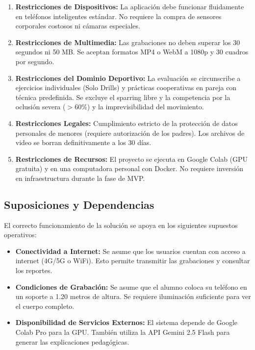 \documentclass[12pt,letterpaper]{article}
\begin{document}
\begin{enumerate}
    \item \textbf{Restricciones de Dispositivos:} La aplicación debe funcionar fluidamente en teléfonos inteligentes estándar. No requiere la compra de sensores corporales costosos ni cámaras especiales.
    \item \textbf{Restricciones de Multimedia:} Las grabaciones no deben superar los 30 segundos ni 50 MB. Se aceptan formatos MP4 o WebM a 1080p y 30 cuadros por segundo.
    \item \textbf{Restricciones del Dominio Deportivo:} La evaluación se circunscribe a ejercicios individuales (Solo Drills) y prácticas cooperativas en pareja con técnica predefinida. Se excluye el sparring libre y la competencia por la oclusión severa ($>60\%$) y la imprevisibilidad del movimiento.
    \item \textbf{Restricciones Legales:} Cumplimiento estricto de la protección de datos personales de menores (requiere autorización de los padres). Los archivos de video se borran definitivamente a los 30 días.
    \item \textbf{Restricciones de Recursos:} El proyecto se ejecuta en Google Colab (GPU gratuita) y en una computadora personal con Docker. No requiere inversión en infraestructura durante la fase de MVP.
\end{enumerate}

\subsection{Suposiciones y Dependencias}
El correcto funcionamiento de la solución se apoya en los siguientes supuestos operativos:

\begin{itemize}
    \item \textbf{Conectividad a Internet:} Se asume que los usuarios cuentan con acceso a internet (4G/5G o WiFi). Esto permite transmitir las grabaciones y consultar los reportes.
    \item \textbf{Condiciones de Grabación:} Se asume que el alumno coloca su teléfono en un soporte a 1.20 metros de altura. Se requiere iluminación suficiente para ver el cuerpo completo.
    \item \textbf{Disponibilidad de Servicios Externos:} El sistema depende de Google Colab Pro para la GPU. También utiliza la API Gemini 2.5 Flash para generar las explicaciones pedagógicas.
\end{itemize}
\end{document}
